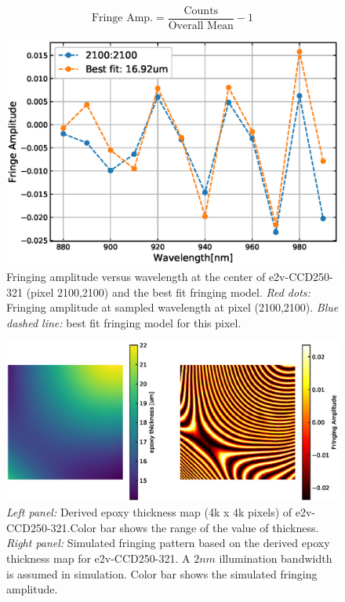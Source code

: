\documentclass[twocolumn]{aastex63} %
\begin{document}
\begin{CJK*}{UTF8}{gbsn}
\begin{equation}
    \mbox{Fringe\ Amp.} = \frac{\mbox{Counts}}{\mbox{Overall\ Mean}}- 1
\end{equation}
\begin{figure}[tb]
\centering
\includegraphics[scale = 0.45]{fit_example.eps}
\caption{Fringing amplitude versus wavelength at the center of e2v-CCD250-321 (pixel 2100,2100) and the best fit fringing model. {\it Red dots:} Fringing amplitude at sampled wavelength at pixel (2100,2100). {\it Blue dashed line:} best fit fringing model for this pixel.} 
\label{fig:Fitting_exmaple}
\end{figure}

\begin{figure}[hbt]
\centering
\includegraphics[scale = 0.6]{e2v-321-map_sim.eps}
\caption{{\it Left panel:} Derived epoxy thickness map (4k x 4k pixels) of e2v-CCD250-321.Color bar shows the range of the value of thickness. {\it Right panel:} Simulated fringing pattern based on the derived epoxy thickness map for e2v-CCD250-321. A $2nm$ illumination bandwidth is assumed in simulation. Color bar shows the simulated fringing amplitude.}
\label{fig:321-map-simulation}
\end{figure}

\end{CJK*}
\end{document}
